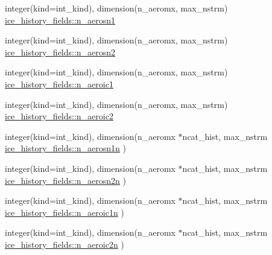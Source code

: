 \begin{DoxyCompactItemize}
\item 
integer(kind=int\_\-kind), dimension(n\_\-aeromx, max\_\-nstrm) \hyperlink{namespaceice__history__fields_afb0db2f3c0c14963f02057fbc84887bc}{ice\_\-history\_\-fields::n\_\-aerosn1}
\item 
integer(kind=int\_\-kind), dimension(n\_\-aeromx, max\_\-nstrm) \hyperlink{namespaceice__history__fields_a4c7ca26f7fe5c329bea1bd5e4a301eed}{ice\_\-history\_\-fields::n\_\-aerosn2}
\item 
integer(kind=int\_\-kind), dimension(n\_\-aeromx, max\_\-nstrm) \hyperlink{namespaceice__history__fields_ad6f36fcab3ebeaa42f44b63a39474c4a}{ice\_\-history\_\-fields::n\_\-aeroic1}
\item 
integer(kind=int\_\-kind), dimension(n\_\-aeromx, max\_\-nstrm) \hyperlink{namespaceice__history__fields_ac48a9741b1cf192db287c558cb4fadb4}{ice\_\-history\_\-fields::n\_\-aeroic2}
\item 
integer(kind=int\_\-kind), dimension(n\_\-aeromx $\ast$ncat\_\-hist, max\_\-nstrm \hyperlink{namespaceice__history__fields_ac520de6cb3b77c13aca8ca21845734f2}{ice\_\-history\_\-fields::n\_\-aerosn1n} )
\item 
integer(kind=int\_\-kind), dimension(n\_\-aeromx $\ast$ncat\_\-hist, max\_\-nstrm \hyperlink{namespaceice__history__fields_a418c55bcea4b5e65a38aa22c871db56f}{ice\_\-history\_\-fields::n\_\-aerosn2n} )
\item 
integer(kind=int\_\-kind), dimension(n\_\-aeromx $\ast$ncat\_\-hist, max\_\-nstrm \hyperlink{namespaceice__history__fields_aa77dba4dfa1d45de1f64c6ae28e7b370}{ice\_\-history\_\-fields::n\_\-aeroic1n} )
\item 
integer(kind=int\_\-kind), dimension(n\_\-aeromx $\ast$ncat\_\-hist, max\_\-nstrm \hyperlink{namespaceice__history__fields_a96d44e16cfbb40e84bad71a4f084c9a6}{ice\_\-history\_\-fields::n\_\-aeroic2n} )
\end{DoxyCompactItemize}
